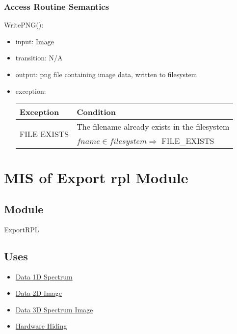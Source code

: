 \documentclass[12pt, titlepage]{article}
\begin{document}
\subsubsection{Access Routine Semantics}

\noindent WritePNG():
\begin{itemize}
    \item input: \hyperref[Mod:Image]{Image}
    \item transition: N/A
    \item output: png file containing image data, written to filesystem
    \item exception:
    \begin{center}
        \begin{tabular}{p{3cm} p{12cm}}
            \toprule[0.15em]
            \textbf{Exception} & \textbf{Condition}\\
            \midrule[0.1em]
            \multirow{2}{0.25\textwidth}{FILE EXISTS} & The filename already exists in the filesystem\\ 
            & $fname \in filesystem \Rightarrow$ FILE\_EXISTS\\ 
            \bottomrule[0.15em]
        \end{tabular}
    \end{center}
\end{itemize}

\section{MIS of Export rpl Module} \label{Mod:ExportRPL}

\subsection{Module}

ExportRPL

\subsection{Uses}
\begin{itemize}
    \item \hyperref[Mod:Spectrum]{Data 1D Spectrum}
    \item \hyperref[Mod:Image]{Data 2D Image}
    \item \hyperref[Mod:SI]{Data 3D Spectrum Image}
    \item \hyperref[Mod:HH]{Hardware Hiding}
\end{itemize}
\end{document}
